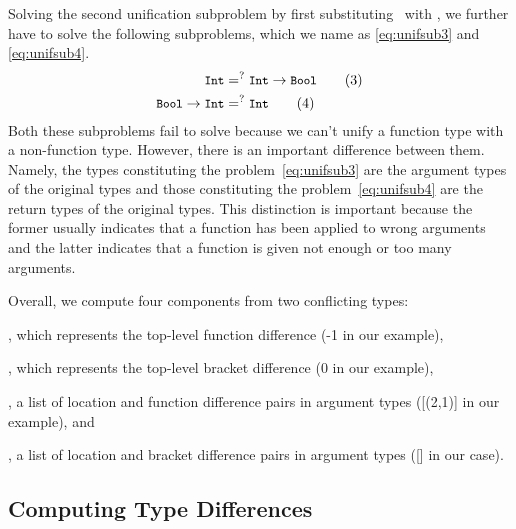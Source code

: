 \documentclass[12pt]{report}	%
\begin{document}
Solving the second unification subproblem by first substituting \tv\ with \Int, we
further have to solve the following subproblems, which we name as \eqref{eq:unifsub3}
and \eqref{eq:unifsub4}.
%
\begin{align}
{\small\texttt{Int}} & =^?  {\small\texttt{Int}} \to {\small\texttt{Bool}} \tag{3}\label{eq:unifsub3}\\
{\small\texttt{Bool}} \to {\small\texttt{Int}} & =^? {\small\texttt{Int}} \tag{4} \label{eq:unifsub4}
\end{align}
%
Both these subproblems fail to solve because we can't
unify a function type with a non-function type. However,
there is an important difference between them. Namely,
the types constituting the problem~\eqref{eq:unifsub3} are the
argument types of the original types and those constituting
the problem~\eqref{eq:unifsub4} are the return types of the original
types. This distinction is important because the former usually
indicates that a function has been applied to
wrong arguments and the latter indicates
that a function is given not enough or too many arguments.

Overall, we compute four components from two conflicting types:
\begin{enumerate*}[label=(\arabic*)]
\item \TopLevelDiff, which represents the top-level
function difference (-1 in our example),

\item \TopBracketDiff, which represents the top-level bracket
difference (0 in our example),

\item \FuncDiff, a list of location and function difference pairs in
argument types ([(2,1)] in our example), and

\item \BracketDiff, a list of location and bracket difference pairs
in argument types ([] in our case).
%
\end{enumerate*}

\subsection{Computing Type Differences}
\label{sec:unify:alg}
\end{document}
